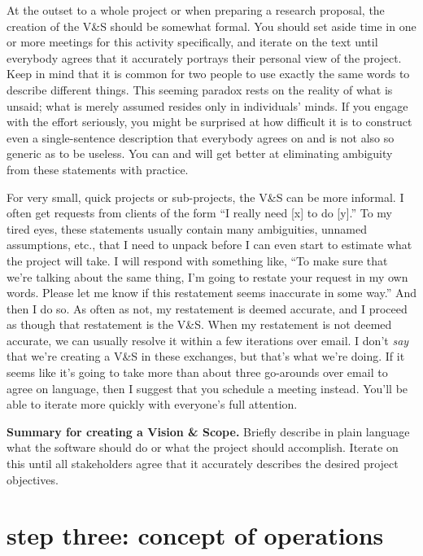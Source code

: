 \documentclass[12pt,oneside]{book}
\begin{document}
At the outset to a whole project or when preparing a research proposal, the creation of the V\&S should be somewhat formal. You should set aside time in one or more meetings for this activity specifically, and iterate on the text until everybody agrees that it accurately portrays their personal view of the project. Keep in mind that it is common for two people to use exactly the same words to describe different things. This seeming paradox rests on the reality of what is unsaid; what is merely assumed resides only in individuals' minds. If you engage with the effort seriously, you might be surprised at how difficult it is to construct even a single-sentence description that everybody agrees on and is not also so generic as to be useless. You can and will get better at eliminating ambiguity from these statements with practice.

For very small, quick projects or sub-projects, the V\&S can be more informal. I often get requests from clients of the form ``I really need [x] to do [y].'' To my tired eyes, these statements usually contain many ambiguities, unnamed assumptions, etc., that I need to unpack before I can even start to estimate what the project will take. I will respond with something like, ``To make sure that we're talking about the same thing, I'm going to restate your request in my own words. Please let me know if this restatement seems inaccurate in some way.'' And then I do so. As often as not, my restatement is deemed accurate, and I proceed as though that restatement is the V\&S. When my restatement is not deemed accurate, we can usually resolve it within a few iterations over email. I don't \emph{say} that we're creating a V\&S in these exchanges, but that's what we're doing. If it seems like it's going to take more than about three go-arounds over email to agree on language, then I suggest that you schedule a meeting instead. You'll be able to iterate more quickly with everyone's full attention.

\hfill
\begin{mdframed}[everyline=true]
\textbf{Summary for creating a Vision \& Scope.} Briefly describe in plain language what the software should do or what the project should accomplish. Iterate on this until all stakeholders agree that it accurately describes the desired project objectives.
\end{mdframed}

\newpage
{}
\section*{step three: concept of operations}
\end{document}
